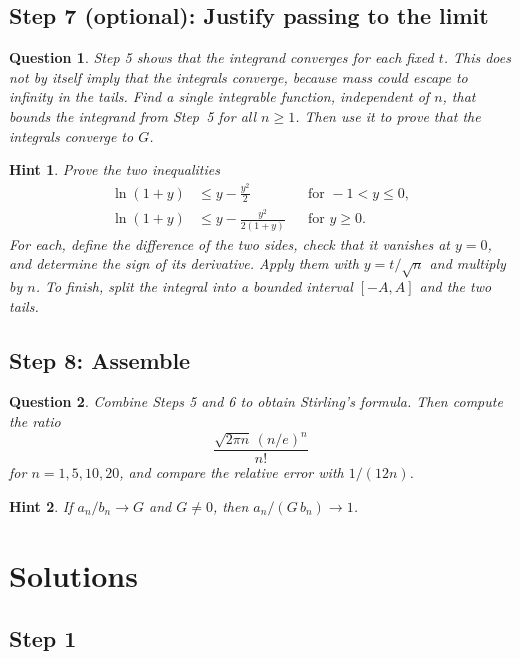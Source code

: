 \documentclass{workbook}
\theoremstyle{step}
\newtheorem*{question}{Question}
\newtheorem*{hint}{Hint}
\begin{document}
\subsection*{Step 7 (optional): Justify passing to the limit}

\begin{question}
Step 5 shows that the integrand converges for each fixed $t$. This does not
by itself imply that the integrals converge, because mass could escape to
infinity in the tails. Find a single integrable function, independent of
$n$, that bounds the integrand from Step~5 for all $n \ge 1$. Then use it to
prove that the integrals converge to $G$.
\end{question}

\begin{hint}
Prove the two inequalities
\begin{align*}
  \ln(1+y) &\le y - \frac{y^2}{2}      && \text{for } -1 < y \le 0, \\
  \ln(1+y) &\le y - \frac{y^2}{2(1+y)} && \text{for } y \ge 0 .
\end{align*}
For each, define the difference of the two sides, check that it vanishes at
$y = 0$, and determine the sign of its derivative. Apply them with
$y = t/\sqrt{n}$ and multiply by $n$. To finish, split the integral into a
bounded interval $[-A, A]$ and the two tails.
\end{hint}

\subsection*{Step 8: Assemble}

\begin{question}
Combine Steps 5 and 6 to obtain Stirling's formula. Then compute the ratio
\[
  \frac{\sqrt{2\pi n}\,(n/e)^n}{n!}
\]
for $n = 1, 5, 10, 20$, and compare the relative error with $1/(12n)$.
\end{question}

\begin{hint}
If $a_n/b_n \to G$ and $G \ne 0$, then $a_n / (G\,b_n) \to 1$.
\end{hint}

\section{Solutions}\label{sec:solutions}

\subsection*{Step 1}
\end{document}
